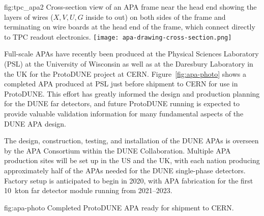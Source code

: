 \begin{dunefigure}{fig:tpc_apa2}
{Cross-section view of an APA frame near the head end showing the layers of wires ($X,V,U,G$ inside to out) on both sides of the frame and terminating on wire boards at the head end of the frame, which connect directly to TPC readout electronics.} 
\texttt{[image: apa-drawing-cross-section.png]} 
\end{dunefigure} 

Full-scale APAs have recently been produced at the Physical Sciences Laboratory (PSL) at the University of Wisconsin as well as at the Daresbury Laboratory in the UK for the ProtoDUNE project at CERN. Figure~\ref{fig:apa-photo} shows a completed APA produced at PSL just before shipment to CERN for use in ProtoDUNE. This effort has greatly informed the design and production planning for the DUNE far detectors, and future ProtoDUNE running is expected to provide valuable validation information for many fundamental aspects of the DUNE APA design. 

The design, construction, testing, and installation of the DUNE APAs is overseen by the APA Consortium within the DUNE Collaboration. Multiple APA production sites will be set up in the US and the UK, with each nation producing approximately half of the APAs needed for the DUNE single-phase detectors.  Factory setup is anticipated to begin in 2020, with APA fabrication for the first \SI{10}{kton} far detector module running from 2021--2023.  

\begin{dunefigure}{fig:apa-photo}
{Completed ProtoDUNE APA ready for shipment to CERN.}
\setlength{\fboxsep}{0pt}
\setlength{\fboxrule}{0.5pt}
\end{dunefigure}